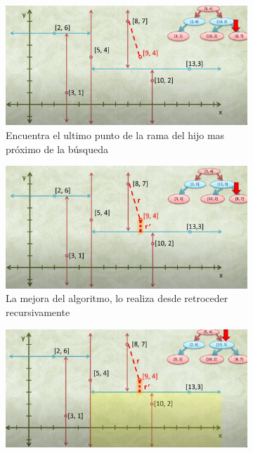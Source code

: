 \documentclass{article}
\begin{document}
            \begin{figure}
             \centering
             \begin{subfigure}[b]{0.4\linewidth}
                 \centering
                 \includegraphics[width=\textwidth]{img/knn5.PNG}
                 \caption{Encuentra el ultimo punto de la rama del hijo mas próximo de la búsqueda}
                 \label{fig:knn5}
             \end{subfigure}
             \hfill
             \begin{subfigure}[b]{0.4\linewidth}
                 \centering
                 \includegraphics[width=\textwidth]{img/knn6.PNG}
                 \caption{La mejora del algoritmo, lo realiza desde retroceder recursivamente}
                 \label{fig:knn6}
             \end{subfigure}
             \hfill
             \begin{subfigure}[b]{0.4\linewidth}
                 \centering
                 \includegraphics[width=\textwidth]{img/knn7.PNG}

\end{subfigure}
\end{figure}
\end{document}
